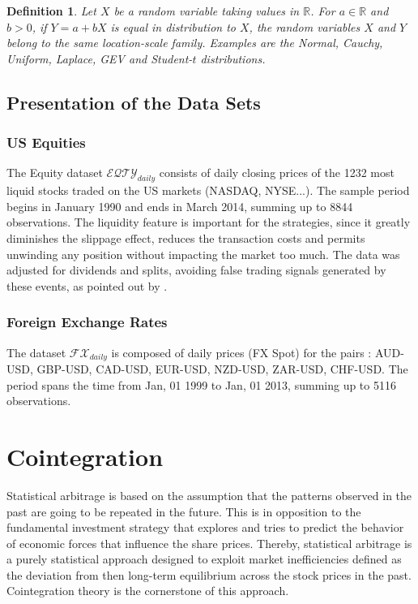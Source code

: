 \documentclass[11pt,a4,twosided,singlespacing,titlepagenumber=on]{scrreprt}
\numberwithin{equation}{chapter} %
\newtheorem{definition}[theorem]{Definition}%
\theoremstyle{remark}
\begin{document}
\begin{definition}
\label{location_scale_family}
Let $X$ be a random variable taking values in $\mathbb{R}$. For $a \in \mathbb{R}$ and $b > 0$, if $Y = a + b X$ is equal in distribution to $X$, the random variables $X$ and $Y$ belong to the same location-scale family. Examples are the Normal, Cauchy, Uniform, Laplace, GEV and Student-$t$ distributions.
\end{definition}

\section{Presentation of the Data Sets}
\subsection{US Equities}
\label{sec:presentation_data}
The Equity dataset $\mathcal{EQTY}_{daily}$ consists of daily closing prices of the 1232 most liquid stocks traded on the US markets (NASDAQ, NYSE...). The sample period begins in January 1990 and ends in March 2014, summing up to 8844 observations. The liquidity feature is important for the strategies, since it greatly diminishes the slippage effect, reduces the transaction costs and permits unwinding any position without impacting the market too much. The data was adjusted for dividends and splits, avoiding false trading signals generated by these events, as pointed out by \cite{broussard2012}.

\subsection{Foreign Exchange Rates}
The dataset $\mathcal{FX}_{daily}$ is composed of daily prices (FX Spot) for the pairs : AUD-USD, GBP-USD, CAD-USD, EUR-USD, NZD-USD, ZAR-USD, CHF-USD. The period spans the time from Jan, 01 1999 to Jan, 01 2013, summing up to 5116 observations.

\chapter{Cointegration}

Statistical arbitrage is based on the assumption that the patterns observed in the past are going to be repeated in the future. This is in opposition to the fundamental investment strategy that explores and tries to predict the behavior of economic forces that influence the share prices. Thereby, statistical arbitrage is a purely statistical approach designed to exploit market inefficiencies defined as the deviation from then long-term equilibrium across the stock prices in the past. Cointegration theory is the cornerstone of this approach. 
\end{document}
